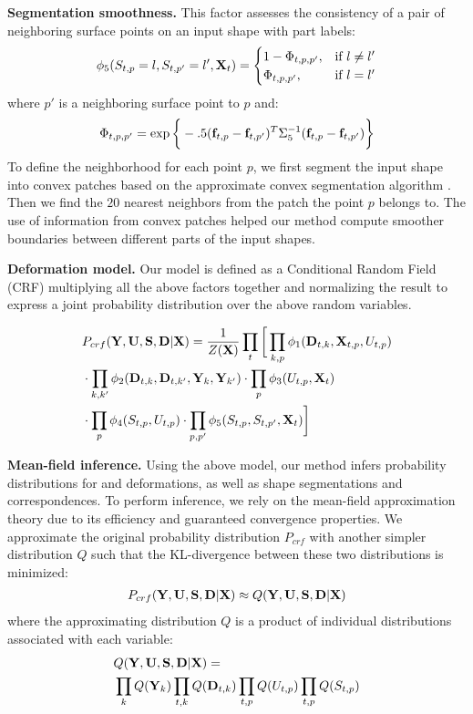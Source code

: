 \textbf{Segmentation smoothness.} This factor assesses the consistency of a pair of neighboring surface points on an input shape with part labels: 
\begin{align*}
\phi_5 ( S_{t,p} = l, S_{t,p'} = l', \mathbf{X}_t ) = 
\begin{cases}
    1 - \Phi_{t,p,p'},& \text{if } l \ne l' \\
    \Phi_{t,p,p'},& \text{if } l = l' \\
\end{cases} 
\end{align*}
where $p'$ is a neighboring surface point to $p$ and:
\begin{align*}
\Phi_{t,p,p'} = \exp\bigg\{ - .5(\mathbf{f}_{t,p} - \mathbf{f}_{t,p'})^T \Sigma_5^{-1} (\mathbf{f}_{t,p} - \mathbf{f}_{t,p'})  \bigg\}
\end{align*}
To define the neighborhood for each point $p$, we first segment the input shape into convex patches based on the approximate convex segmentation algorithm \cite{Asafi13}. Then we find the $20$ nearest neighbors from the patch the point $p$ belongs to. The use of information from convex patches helped our method compute smoother boundaries between different parts of the input shapes. 

\textbf{Deformation model.} Our model is defined as a Conditional Random Field (CRF) \cite{Koller09} multiplying all the above factors together and normalizing the result to express a joint probability distribution over the above random variables. 

\begin{align}
& P_{crf}( \mathbf{Y}, \mathbf{U}, \mathbf{S}, \mathbf{D} | \mathbf{X} ) = \frac{1}{Z(\mathbf{X})} \prod\limits_t \bigg[ \prod\limits_{k,p} \phi_1 (\mathbf{D}_{t,k}, \mathbf{X}_{t,p}, U_{t,p}) \nonumber \\ 
& \cdot \prod\limits_{k, k'} \phi_2( \mathbf{D}_{t,k}, \mathbf{D}_{t,k'}, \mathbf{Y}_k, \mathbf{Y}_{k'} ) \cdot \prod\limits_{p} \phi_3 ( U_{t,p}, \mathbf{X}_t ) \nonumber  \\
& \cdot \prod\limits_{p} \phi_4 ( S_{t,p}, U_{t,p} ) \cdot \prod\limits_{p, p'} \phi_5 ( S_{t,p}, S_{t,p'}, \mathbf{X}_t ) \bigg]
\label{eq:objective}
\end{align}

\textbf{Mean-field inference.} Using the above model, our method infers probability distributions for  and deformations, as well as shape segmentations and correspondences. To perform inference, we rely on the mean-field approximation theory due to its efficiency and guaranteed convergence properties. We approximate the original probability distribution $P_{crf}$ with another simpler distribution $Q$ such that the KL-divergence between these two distributions is minimized: 
\begin{align*}
P_{crf}( \mathbf{Y}, \mathbf{U}, \mathbf{S}, \mathbf{D} | \mathbf{X} )  \approx Q( \mathbf{Y}, \mathbf{U}, \mathbf{S}, \mathbf{D} | \mathbf{X} )
\end{align*}
where the approximating distribution $Q$ is a product of individual distributions associated with each variable:
\begin{align*}
& Q( \mathbf{Y}, \mathbf{U}, \mathbf{S}, \mathbf{D} | \mathbf{X} ) = \\
& \prod\limits_k Q( \mathbf{Y}_k ) \prod\limits_{t,k} Q( \mathbf{D}_{t,k} ) \prod\limits_{t,p} Q( U_{t,p} ) \prod\limits_{t,p} Q( S_{t,p} )
\end{align*}

